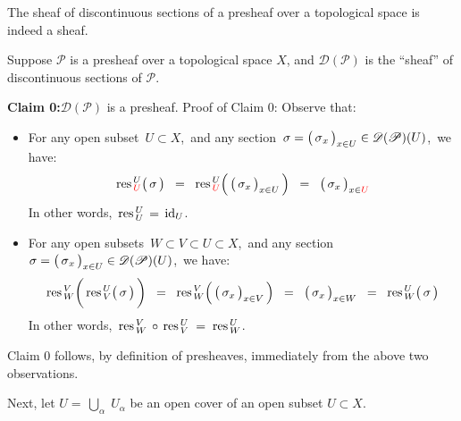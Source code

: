 
\vskip 0.5cm
\begin{proposition}
\mbox{}\vskip 0.1cm
\noindent
The sheaf of discontinuous sections of a presheaf over a topological space is indeed a sheaf.
\end{proposition}
\proof
\vskip 0.3cm
\noindent
Suppose $\mathscr{P}$ is a presheaf over a topological space $X$, and
$\mathscr{D}(\mathscr{P})$ is the ``sheaf'' of discontinuous sections of $\mathscr{P}$.

\vskip 0.5cm
\noindent
\textbf{Claim 0:}\quad $\mathscr{D}(\mathscr{P})$ is a presheaf.
\vskip 0.2cm
\noindent
Proof of Claim 0:\;\; Observe that:
\begin{itemize}
\item
	For any open subset \,$U \subset X$,\, and any section
	\,$\sigma = \left(\,\overset{{\color{white}.}}{\sigma}_{x}\,\right)_{x \in U} \in \mathscr{D}(\mathscr{P})(U)$,\,
	we have:
	\begin{equation*}
	\res^{\,U}_{\,{\color{red}U}}\!\left(\,\overset{{\color{white}.}}{\sigma}\,\right)
	\;\; = \;\;
		\res^{\,U}_{\,{\color{red}U}}\!\left(\,\left(\,\overset{{\color{white}.}}{\sigma_{x}}\,\right)_{x \in U}\,\right)
	\;\; = \;\;
		\left(\,\overset{{\color{white}.}}{\sigma_{x}}\,\right)_{x \in {\color{red}U}}
	\end{equation*}
	In other words, \,$\textnormal{res}^{\,U}_{\,U} \,=\, \textnormal{id}_{U}$.
\item
	For any open subsets \,$W \subset V \subset U \subset X$,\, and any section
	\,$\sigma = \left(\,\overset{{\color{white}.}}{\sigma}_{x}\,\right)_{x \in U} \in \mathscr{D}(\mathscr{P})(U)$,\,
	we have:
	\begin{equation*}
	\res^{\,V}_{\,W}\!\left(\,
		\overset{{\color{white}\textnormal{\large$.$}}}{\res^{\,U}_{\,V}}
		\!\left(\,\overset{{\color{white}.}}{\sigma}\,\right)
		\,\right)
	\;\; = \;\;
		\res^{\,V}_{\,W}\!\left(\,\left(\,\overset{{\color{white}.}}{\sigma_{x}}\,\right)_{x \in V}\,\right)
	\;\; = \;\;
		\left(\,\overset{{\color{white}.}}{\sigma_{x}}\,\right)_{x \in W}
	\;\; = \;\;
		\res^{\,U}_{\,W}\!\left(\,\overset{{\color{white}.}}{\sigma}\,\right)
	\end{equation*}
	In other words, \,$\textnormal{res}^{\,V}_{\,W} \,\circ\, \textnormal{res}^{\,U}_{\,V} \; = \; \textnormal{res}^{\,U}_{\,W}$.
\end{itemize} 
Claim 0 follows, by definition of presheaves, immediately from the above two observations.

\vskip 0.5cm
\noindent
Next, let $U = \,\underset{\alpha}{\bigcup}\;U_{\alpha}$ be an open cover of an open subset $U \subset X$.

